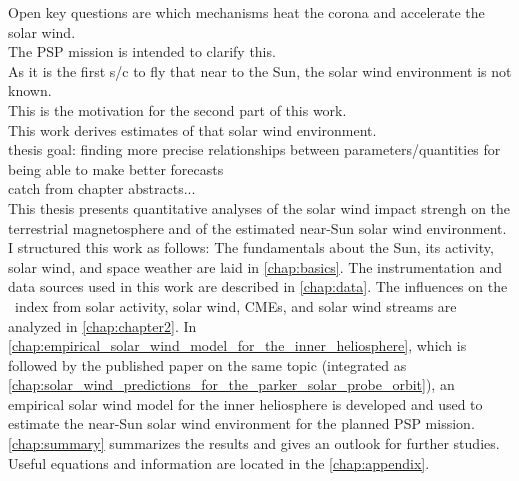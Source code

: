 Open key questions are which mechanisms heat the corona and accelerate the solar wind.\\
The PSP mission is intended to clarify this.\\
As it is the first s/c to fly that near to the Sun, the solar wind environment is not known.\\
This is the motivation for the second part of this work.\\
This work derives estimates of that solar wind environment.\\

thesis goal: finding more precise relationships between parameters/quantities for being able to make better forecasts\\

catch from chapter abstracts...\\

This thesis presents quantitative analyses of the solar wind impact strengh on the terrestrial magnetosphere and of the estimated near-Sun solar wind environment.\\


I structured this work as follows: The fundamentals about the Sun, its activity, solar wind, and space weather are laid in \autoref{chap:basics}. The instrumentation and data sources used in this work are described in \autoref{chap:data}. The influences on the \Kp{}~index from solar activity, solar wind, CMEs, and solar wind streams are analyzed in \autoref{chap:chapter2}. In \autoref{chap:empirical_solar_wind_model_for_the_inner_heliosphere}, which is followed by the published paper on the same topic (integrated as \autoref{chap:solar_wind_predictions_for_the_parker_solar_probe_orbit}), an empirical solar wind model for the inner heliosphere is developed and used to estimate the near-Sun solar wind environment for the planned PSP mission. \autoref{chap:summary} summarizes the results and gives an outlook for further studies. Useful equations and information are located in the \autoref{chap:appendix}.



